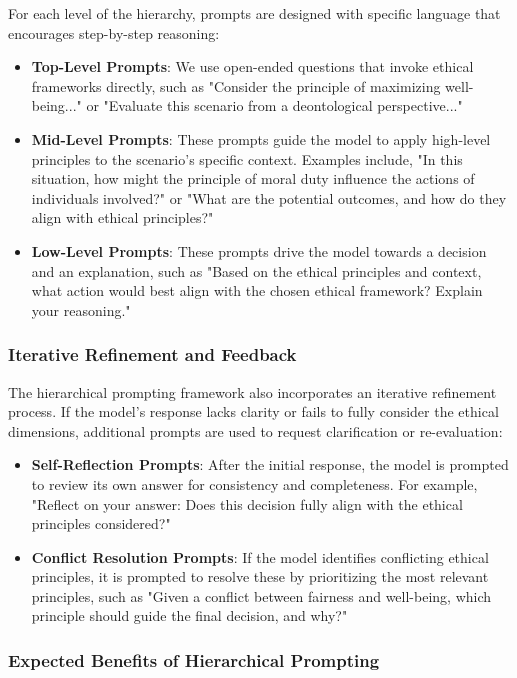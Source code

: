 \documentclass{article}
\begin{document}
For each level of the hierarchy, prompts are designed with specific language that encourages step-by-step reasoning:
\begin{itemize}
    \item \textbf{Top-Level Prompts}: We use open-ended questions that invoke ethical frameworks directly, such as "Consider the principle of maximizing well-being..." or "Evaluate this scenario from a deontological perspective..."
    \item \textbf{Mid-Level Prompts}: These prompts guide the model to apply high-level principles to the scenario’s specific context. Examples include, "In this situation, how might the principle of moral duty influence the actions of individuals involved?" or "What are the potential outcomes, and how do they align with ethical principles?"
    \item \textbf{Low-Level Prompts}: These prompts drive the model towards a decision and an explanation, such as "Based on the ethical principles and context, what action would best align with the chosen ethical framework? Explain your reasoning."
\end{itemize}

\subsubsection{Iterative Refinement and Feedback}

The hierarchical prompting framework also incorporates an iterative refinement process. If the model's response lacks clarity or fails to fully consider the ethical dimensions, additional prompts are used to request clarification or re-evaluation:
\begin{itemize}
    \item \textbf{Self-Reflection Prompts}: After the initial response, the model is prompted to review its own answer for consistency and completeness. For example, "Reflect on your answer: Does this decision fully align with the ethical principles considered?"
    \item \textbf{Conflict Resolution Prompts}: If the model identifies conflicting ethical principles, it is prompted to resolve these by prioritizing the most relevant principles, such as "Given a conflict between fairness and well-being, which principle should guide the final decision, and why?"
\end{itemize}


\subsubsection{Expected Benefits of Hierarchical Prompting}
\end{document}
